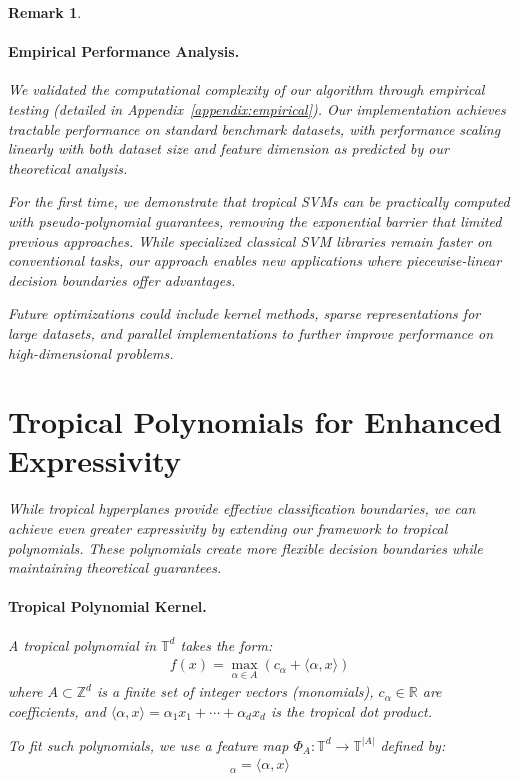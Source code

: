 \documentclass{article}
\newtheorem{remark}{Remark}
\newcommand{\R}{\mathbb{R}}
\newcommand{\trop}{\mathbb{T}}
\begin{document}
\begin{remark}
\paragraph{Empirical Performance Analysis.}
We validated the computational complexity of our algorithm through empirical testing (detailed in Appendix~\ref{appendix:empirical}). Our implementation achieves tractable performance on standard benchmark datasets, with performance scaling linearly with both dataset size and feature dimension as predicted by our theoretical analysis.

For the first time, we demonstrate that tropical SVMs can be practically computed with pseudo-polynomial guarantees, removing the exponential barrier that limited previous approaches. While specialized classical SVM libraries remain faster on conventional tasks, our approach enables new applications where piecewise-linear decision boundaries offer advantages.

Future optimizations could include kernel methods, sparse representations for large datasets, and parallel implementations to further improve performance on high-dimensional problems.

\section{Tropical Polynomials for Enhanced Expressivity}\label{sec:polynomials}

While tropical hyperplanes provide effective classification boundaries, we can achieve even greater expressivity by extending our framework to tropical polynomials. These polynomials create more flexible decision boundaries while maintaining theoretical guarantees.

\paragraph{Tropical Polynomial Kernel.}
A tropical polynomial in $\trop^d$ takes the form:
\begin{align}
f(x) = \max_{\alpha \in A} (c_\alpha + \langle \alpha, x \rangle)
\end{align}
where $A \subset \mathbb{Z}^d$ is a finite set of integer vectors (monomials), $c_\alpha \in \R$ are coefficients, and $\langle \alpha, x \rangle = \alpha_1 x_1 + \cdots + \alpha_d x_d$ is the tropical dot product.

To fit such polynomials, we use a feature map $\Phi_A: \trop^d \to \trop^{|A|}$ defined by:
\begin{align}
[\Phi_A(x)]_\alpha = \langle \alpha, x \rangle
\end{align}


\end{remark}
\end{document}
